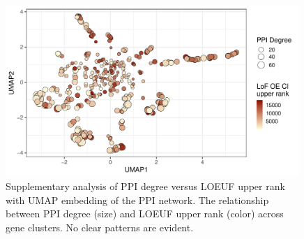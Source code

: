 \begin{figure}[ht]
  \centering
  \includegraphics[width=0.99\textwidth]{../images/untangleR_ppi_network_p_umap_const.pdf}
  \caption{
   Supplementary analysis of PPI degree versus LOEUF upper rank with UMAP embedding of the PPI network.
    The relationship between PPI degree (size) and LOEUF upper rank (color) across gene clusters. No clear patterns are evident.
  }
  \label{fig:p_umap_const}
\end{figure}




